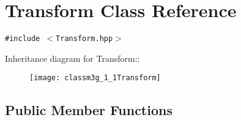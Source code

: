 \hypertarget{classm3g_1_1Transform}{
\section{Transform Class Reference}
\label{classm3g_1_1Transform}
}
{\tt \#include $<$Transform.hpp$>$}

Inheritance diagram for Transform::\begin{figure}[H]
\begin{center}
\leavevmode
\texttt{[image: classm3g\_1\_1Transform]}
\end{center}
\end{figure}
\subsection*{Public Member Functions}
